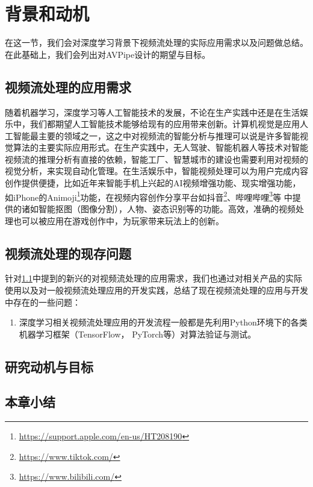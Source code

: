 
\chapter{背景和动机}
在这一节，我们会对深度学习背景下视频流处理的实际应用需求以及问题做总结。在此基础上，我们会列出对AVPipe设计的期望与目标。
\section{视频流处理的应用需求}\label{ch3:req}
随着机器学习，深度学习等人工智能技术的发展，不论在生产实践中还是在生活娱乐中，我们都期望人工智能技术能够给现有的应用带来创新。计算机视觉是应用人工智能最主要的领域之一，这之中对视频流的智能分析与推理可以说是许多智能视觉算法的主要实际应用形式。在生产实践中，无人驾驶、智能机器人等技术对智能视频流的推理分析有直接的依赖，智能工厂、智慧城市的建设也需要利用对视频的视觉分析，来实现自动化管理。在生活娱乐中，智能视频处理可以为用户完成内容创作提供便捷，比如近年来智能手机上兴起的AI视频增强功能、现实增强功能，如iPhone的Animoji\footnote{\url{https://support.apple.com/en-us/HT208190}}功能，在视频内容创作分享平台如抖音\footnote{\url{https://www.tiktok.com/}}、哔哩哔哩\footnote{\url{https://www.bilibili.com/}}等 %
中提供的诸如智能抠图（图像分割），人物、姿态识别等的功能。高效，准确的视频处理也可以被应用在游戏创作中，为玩家带来玩法上的创新。\par
\section{视频流处理的现存问题}
针对\ref{ch3:req}中提到的新兴的对视频流处理的应用需求，我们也通过对相关产品的实际使用以及对一般视频流处理应用的开发实践，总结了现在视频流处理的应用与开发中存在的一些问题：
\begin{enumerate}
    \item 深度学习相关视频流处理应用的开发流程一般都是先利用Python环境下的各类机器学习框架（TensorFlow， PyTorch等）对算法验证与测试。
\end{enumerate}

\section{研究动机与目标}


\section{本章小结}
